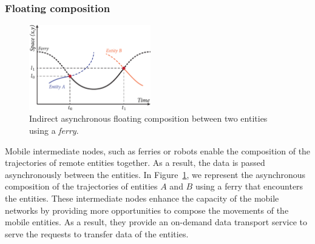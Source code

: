 \subsubsection{Floating composition}
\label{sec:indirect-async-non-anchored}


\begin{figure}
    \vspace{-37pt}
    \includegraphics[width=5.3cm]{figures/dtn-indirect-async-nongeo.pdf}
    \caption{Indirect asynchronous floating composition between two entities using a \textit{ferry}.}
    \label{fig:dtn-indirect-async-nongeo}
\end{figure}
Mobile intermediate nodes, such as ferries or robots enable the composition of the trajectories of remote entities together. As a result, the data is passed asynchronously between the entities. In Figure~\ref{fig:dtn-indirect-async-nongeo}, we represent the asynchronous composition of the trajectories of entities $A$ and $B$ using a ferry that encounters the entities. These intermediate nodes enhance the capacity of the mobile networks by providing more opportunities to compose the movements of the mobile entities. As a result, they provide an on-demand data transport service to serve the requests to transfer data of the entities.

